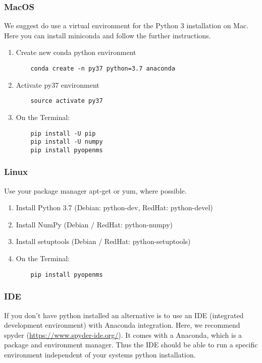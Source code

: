 {\subsubsection{MacOS}
We suggest do use a virtual environment for the Python 3 installation on Mac. 
Here you can install miniconda and follow the further instructions. \\

\begin{enumerate}
  \item Create new conda python environment
    \begin{lstlisting}
    conda create -n py37 python=3.7 anaconda
    \end{lstlisting} 
    \item Activate py37 environment
    \begin{lstlisting}
    source activate py37
    \end{lstlisting} 
  \item On the Terminal:
    \begin{lstlisting}
    pip install -U pip
    pip install -U numpy
    pip install pyopenms
    \end{lstlisting}
\end{enumerate}

\subsubsection{Linux}
Use your package manager apt-get or yum, where possible.
\begin{enumerate}
  \item Install Python 3.7 (Debian: python-dev, RedHat: python-devel)
  \item Install NumPy (Debian / RedHat: python-numpy)
  \item Install setuptools (Debian / RedHat: python-setuptools)
  \item On the Terminal:
    \begin{lstlisting}
    pip install pyopenms
    \end{lstlisting}
\end{enumerate}

\subsubsection{IDE}
If you don't have python installed an  alternative is to use an IDE (integrated development environment) with Anaconda integration. Here, we recommend spyder (\url{https://www.spyder-ide.org/}). It comes with a Anaconda, which is a package and environment manager. Thus the IDE should be able to run a specific environment independent of your systems python installation. \\

}
